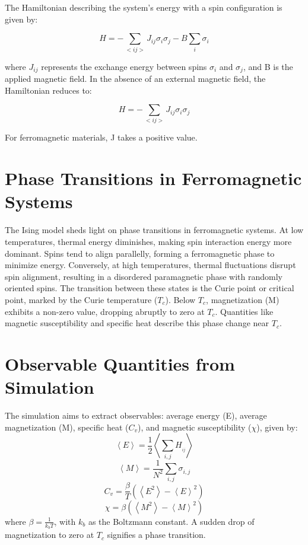 \documentclass{article}
\begin{document}
The Hamiltonian describing the system's energy with a spin configuration is given by:

\[H=-\sum_{<ij> }J_{ij}\sigma _{i}\sigma _{j} - B\sum_{i}\sigma _{i}\]

where $J_{ij}$ represents the exchange energy between spins $\sigma _{i}$ and $\sigma _{j}$, and B is the applied magnetic field. In the absence of an external magnetic field, the Hamiltonian reduces to:

\[H=-\sum_{<ij> }J_{ij}\sigma _{i}\sigma _{j}\]

For ferromagnetic materials, J takes a positive value.

\section{Phase Transitions in Ferromagnetic Systems}
The Ising model sheds light on phase transitions in ferromagnetic systems. At low temperatures, thermal energy diminishes, making spin interaction energy more dominant. Spins tend to align parallelly, forming a ferromagnetic phase to minimize energy. Conversely, at high temperatures, thermal fluctuations disrupt spin alignment, resulting in a disordered paramagnetic phase with randomly oriented spins. The transition between these states is the Curie point or critical point, marked by the Curie temperature ($T_{c}$). Below $T_{c}$, magnetization (M) exhibits a non-zero value, dropping abruptly to zero at $T_{c}$. Quantities like magnetic susceptibility and specific heat describe this phase change near $T_{c}$.

\section{Observable Quantities from Simulation}
The simulation aims to extract observables: average energy (E), average magnetization (M), specific heat ($C_{v}$), and magnetic susceptibility ($\chi$), given by:
\[\left \langle E \right \rangle= \frac{1}{2}\left \langle \sum_{i,j}H_{_{ij}}^{} \right \rangle\]
\[ \left \langle M \right \rangle=\frac{1}{N^{2}}\sum_{i,j}\sigma_{i,j} ^{}\]
\[C_{v}=\frac{\beta }{T}\left ( \left \langle E^{2} \right \rangle -\left \langle E \right \rangle^{2}\right)\]
\[ \chi =\beta\left ( \left \langle M^{2} \right \rangle -\left \langle M \right \rangle^{2}\right)\]
where $\beta = \frac{1}{k_{b}T}$, with $k_{b}$ as the Boltzmann constant. A sudden drop of magnetization to zero at $T_{c}$ signifies a phase transition.
\end{document}
